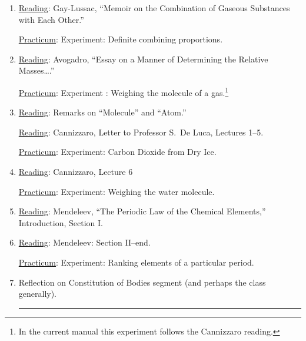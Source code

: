 \documentclass{article}
\newcommand{\rd}{\uline{Reading}}
\newcommand{\pc}{\uline{Practicum}}
\begin{document}
\begin{enumerate}
\rd: Thomson, Extracts from \emph{System of Chemistry}.
 Appendix 2: Berthollet and Proust.  

\pc: \label{multiple}Experiment: Multiple combining proportions.\footnote{\label{reversed}The order of practica on days \ref{multiple} and \ref{definite} is sometimes reversed.} %

\item \rd: Gay-Lussac, ``Memoir on the Combination of Gaseous Substances with Each Other.'' 

\pc: \label{definite}Experiment: Definite combining proportions.
	
\item \rd: Avogadro, ``Essay on a Manner of Determining the Relative Masses\dots.''  

	\pc: Experiment : Weighing the
molecule of a gas.\footnote{In the current manual this experiment follows the Cannizzaro reading.}

\item \rd: Remarks on ``Molecule'' and ``Atom.''

\rd: Cannizzaro, Letter to Professor S.\ De Luca, Lectures 1--5. 

\pc: Experiment: Carbon Dioxide from Dry Ice.

\item \rd: Cannizzaro, Lecture 6  

\pc: Experiment: Weighing the water molecule.

\item \rd: Mendeleev, ``The Periodic Law of the Chemical Elements,'' Introduction, Section I.

\item \rd: Mendeleev: Section II--end.  

	\pc: Experiment: Ranking elements of a particular period.
	
\item Reflection on Constitution of Bodies segment (and perhaps the class generally). \rule{1.2ex}{1.2ex}

\end{enumerate}


%
%
%
%
%
%
%
%
%
%
%
%
%
%
%
\end{document}
